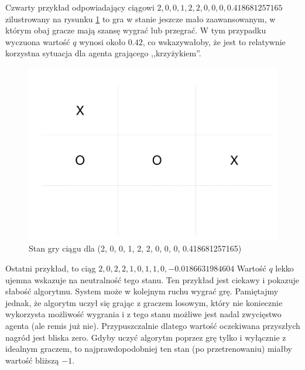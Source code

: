 \documentclass[licencjacka]{pracamgr}
\begin{document}
Czwarty przykład odpowiadający ciągowi $2, 0, 0, 1, 2, 2, 0, 0, 0, 0.418681257165$  zilustrowany na rysunku \ref{Rys12} to gra w stanie jeszcze mało zaawansowanym, w którym obaj gracze mają szansę wygrać lub przegrać. W tym przypadku wyczuona wartość $q$ wynosi około $0.42$, co wskazywałoby, że jest to relatywnie korzystna sytuacja dla agenta grającego ,,krzyżykiem''.

\begin{figure}[h!]
	\includegraphics [scale=0.22] {ttt_4.png}
	\caption{Stan gry ciągu dla (2, 0, 0, 1, 2, 2, 0, 0, 0, 0.418681257165)}
	\label{Rys12}
\end{figure}


Ostatni przykład, to ciąg $ 2, 0, 2, 2, 1, 0, 1, 1, 0, -0.0186631984604$ Wartość $q$ lekko ujemna wskazuje na neutralność tego stanu. Ten przykład jest ciekawy i pokazuje słabość algorytmu. System może w kolejnym ruchu wygrać grę. Pamiętajmy jednak, że algorytm uczył się grając z graczem losowym, który nie koniecznie wykorzysta możliwość wygrania i z tego stanu możliwe jest nadal zwycięstwo agenta (ale remis już nie). Przypuszczalnie dlatego wartość oczekiwana przyszłych nagród jest bliska zero. Gdyby uczyć algorytm poprzez grę tylko i wyłącznie z idealnym graczem, to najprawdopodobniej ten stan (po przetrenowaniu) miałby wartość bliższą $-1$.
\end{document}
